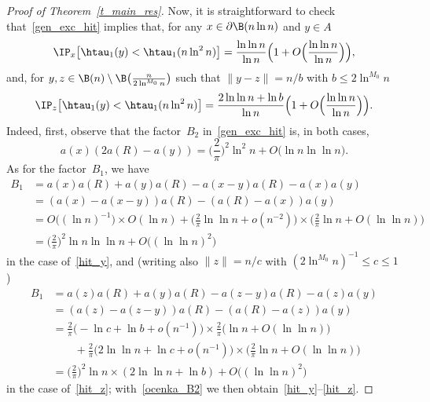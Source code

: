 \begin{proof}[Proof of Theorem~\ref{t_main_res}]
Now, it is straightforward to check that~\eqref{gen_exc_hit} implies that, for any $x\in \partial\B(n\ln n)$ and $y \in A$
\begin{equation}\label{hit_y}
\IP_x\big[\htau_1(y)<\htau_1(n\ln^2 n)\big] = \frac{\ln\ln n}{\ln n}
\Big(1+O\Big(\frac{\ln\ln n}{\ln n}\Big)\Big),
\end{equation}
and, for $y,z\in \B(n)\setminus\B\big(\frac{n}{2\ln^{M_0}n}\big)$ such that $\|y-z\| = n/b$ with $b\leq 2\ln^{M_0}n$
\begin{equation}\label{hit_z}
\IP_z\big[\htau_1(y)<\htau_1(n\ln^2 n)\big] =
\frac{2\ln\ln n + \ln b}{\ln n}
\Big(1+O\Big(\frac{\ln\ln n}{\ln n}\Big)\Big).
\end{equation}
Indeed, first, observe that the factor~$B_2$ in~\eqref{gen_exc_hit} is, in both cases,
\begin{equation}\label{ocenka_B2}
a(x)(2a(R)-a(y)) = \Big(\frac{2}{\pi}\Big)^2
\ln^2 n + O\big(\ln n\ln\ln n\big).
\end{equation}
As for the factor~$B_1$, we have
\begin{align*}
B_1 &= a(x)a(R)+a(y)a(R)-a(x-y)a(R)-a(x)a(y)\\
&= (a(x)-a(x-y))a(R) - (a(R)-a(x))a(y)\\
&= O\big((\ln n)^{-1}\big)\times O(\ln n) + \Big(\frac{2}{\pi}\ln\ln n + o(n^{-2})\Big)
\times \Big(\frac{2}{\pi}\ln n + O(\ln\ln n)\Big)\\
&= \Big(\frac{2}{\pi}\Big)^2
\ln n\ln\ln n + O\big((\ln\ln n)^2\big)
\end{align*}
in the case of~\eqref{hit_y}, and (writing also $\|z\|=n/c$ with $(2\ln^{M_0} n)^{-1}\leq c\leq 1$)
\begin{align*}
B_1 &= a(z)a(R)+a(y)a(R)-a(z-y)a(R)-a(z)a(y)\\
&= (a(z)-a(z-y))a(R) - (a(R)-a(z))a(y)\\
&= \frac{2}{\pi}\big(-\ln c +\ln b + o(n^{-1})\big)
\times \frac{2}{\pi}\big(\ln n + O(\ln\ln n)\big)\\
& \qquad + \frac{2}{\pi}\big(2\ln\ln n +\ln c + o(n^{-1})\big)
\times \Big(\frac{2}{\pi}\ln n + O(\ln\ln n)\Big)\\
&= \Big(\frac{2}{\pi}\Big)^2
\ln n\times(2\ln\ln n + \ln b) + O\big((\ln\ln n)^2\big)
\end{align*}
in the case of~\eqref{hit_z}; with~\eqref{ocenka_B2} we then obtain~\eqref{hit_y}--\eqref{hit_z}.


\end{proof}
